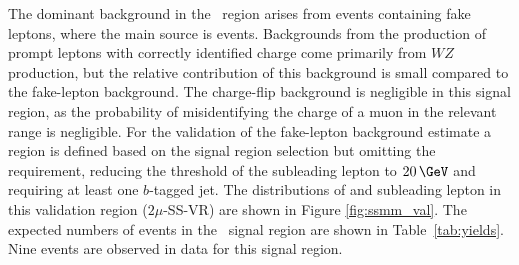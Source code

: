 The dominant background in the \SSLSR\ region arises from events containing
fake leptons, where the main source is \ttbar events. Backgrounds from the
production of prompt leptons with correctly
identified charge come primarily from $WZ$ production, but the relative
contribution of this background is small compared to the fake-lepton
background. The charge-flip background is negligible in this signal region, as
the probability of misidentifying the charge of a muon in the relevant \pT
range is negligible.  
For the validation of the fake-lepton background estimate a region is defined
based on the signal region selection but omitting the \met requirement,
reducing the \pT threshold of the subleading lepton to $20\,\GeV$ and requiring 
at least one $b$-tagged jet.
The distributions of \met and subleading lepton \pT in this validation region ($2\mu$-SS-VR) are shown in
Figure \ref{fig:ssmm_val}.  The expected numbers of events in the \SSLSR\
signal region are shown in Table~\ref{tab:yields}. Nine events are
observed in data for this signal region.
 

